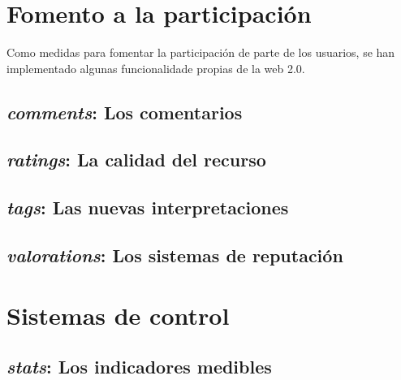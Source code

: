\section{Fomento a la participación}
Como medidas para fomentar la participación de parte de los usuarios, se han
implementado algunas funcionalidade propias de la web 2.0.

\subsection{\emph{comments}: Los comentarios}
\subsection{\emph{ratings}: La calidad del recurso}
\subsection{\emph{tags}: Las nuevas interpretaciones}
\subsection{\emph{valorations}: Los sistemas de reputación}

\section{Sistemas de control}
\subsection{\emph{stats}: Los indicadores medibles}

